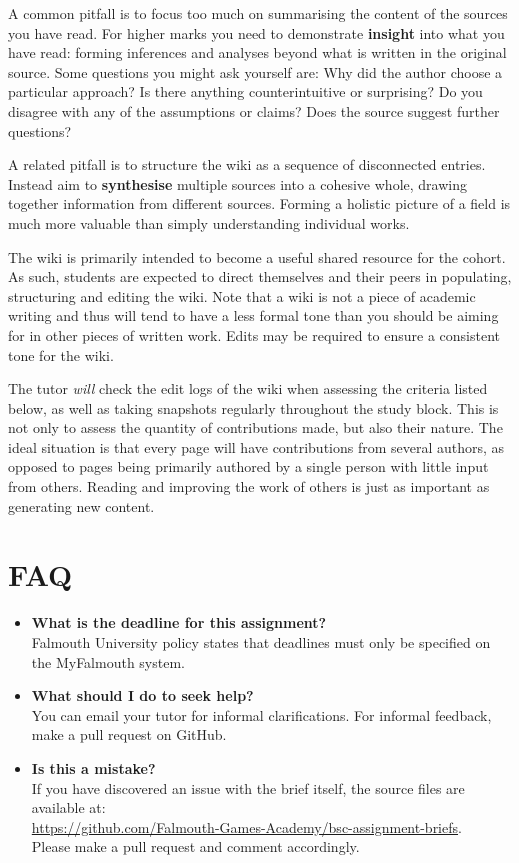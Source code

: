 \documentclass{../../fal_assignment}
\begin{document}
	A common pitfall is to focus too much on summarising the content of the sources you have read.
	For higher marks you need to demonstrate \textbf{insight} into what you have read:
	forming inferences and analyses beyond what is written in the original source.
	Some questions you might ask yourself are:
	Why did the author choose a particular approach?
	Is there anything counterintuitive or surprising?
	Do you disagree with any of the assumptions or claims?
	Does the source suggest further questions?
	
	A related pitfall is to structure the wiki as a sequence of disconnected entries.
	Instead aim to \textbf{synthesise} multiple sources into a cohesive whole,
	drawing together information from different sources.
	Forming a holistic picture of a field is much more valuable than simply understanding individual works.
	
	The wiki is primarily intended to become a useful shared resource for the cohort.
	As such, students are expected to direct themselves and their peers in populating, structuring and editing the wiki.
	Note that a wiki is not a piece of academic writing
	and thus will tend to have a less formal tone than you should be aiming for in other pieces of written work.
	Edits may be required to ensure a consistent tone for the wiki.
	
	The tutor \emph{will} check the edit logs of the wiki when assessing the criteria listed below,
	as well as taking snapshots regularly throughout the study block.
	This is not only to assess the quantity of contributions made,
	but also their nature.
	The ideal situation is that every page will have contributions from several authors,
	as opposed to pages being primarily authored by a single person with little input from others.
	Reading and improving the work of others is just as important as generating new content.
	
	\section*{FAQ}
	
	\begin{itemize}
		\item 	\textbf{What is the deadline for this assignment?} \\ 
		Falmouth University policy states that deadlines must only be specified on the MyFalmouth system.
		
		\item 	\textbf{What should I do to seek help?} \\ 
		You can email your tutor for informal clarifications. For informal feedback, make a pull request on GitHub. 
		
		\item 	\textbf{Is this a mistake?} \\ 	
		If you have discovered an issue with the brief itself, the source files are available at: \\
		\url{https://github.com/Falmouth-Games-Academy/bsc-assignment-briefs}.\\
		Please make a pull request and comment accordingly.
	\end{itemize}
	
\end{document}
